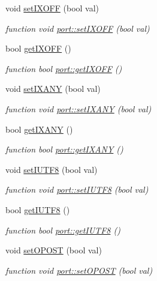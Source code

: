 \begin{DoxyCompactItemize}
void \hyperlink{classport_a0598bc43a59cb71fb08060249d7805da}{set\+I\+X\+O\+FF} (bool val)
\begin{DoxyCompactList}\small\item\em function void \hyperlink{classport_a0598bc43a59cb71fb08060249d7805da}{port\+::set\+I\+X\+O\+FF} (bool val) \end{DoxyCompactList}\item 
bool \hyperlink{classport_a3d517d3f06731348488002fea13b8e88}{get\+I\+X\+O\+FF} ()
\begin{DoxyCompactList}\small\item\em function bool \hyperlink{classport_a3d517d3f06731348488002fea13b8e88}{port\+::get\+I\+X\+O\+FF} () \end{DoxyCompactList}\item 
void \hyperlink{classport_afa286d567530f7b124b7fc2caac4d61a}{set\+I\+X\+A\+NY} (bool val)
\begin{DoxyCompactList}\small\item\em function void \hyperlink{classport_afa286d567530f7b124b7fc2caac4d61a}{port\+::set\+I\+X\+A\+NY} (bool val) \end{DoxyCompactList}\item 
bool \hyperlink{classport_a4a85ca57362115255b5e0049b90ff4e7}{get\+I\+X\+A\+NY} ()
\begin{DoxyCompactList}\small\item\em function bool \hyperlink{classport_a4a85ca57362115255b5e0049b90ff4e7}{port\+::get\+I\+X\+A\+NY} () \end{DoxyCompactList}\item 
void \hyperlink{classport_a7e2ce41de280c0167bcf414c2cbe5dcf}{set\+I\+U\+T\+F8} (bool val)
\begin{DoxyCompactList}\small\item\em function void \hyperlink{classport_a7e2ce41de280c0167bcf414c2cbe5dcf}{port\+::set\+I\+U\+T\+F8} (bool val) \end{DoxyCompactList}\item 
bool \hyperlink{classport_a9575ab3023169a91c984f458702c2f53}{get\+I\+U\+T\+F8} ()
\begin{DoxyCompactList}\small\item\em function bool \hyperlink{classport_a9575ab3023169a91c984f458702c2f53}{port\+::get\+I\+U\+T\+F8} () \end{DoxyCompactList}\item 
void \hyperlink{classport_a4c7b692b00a8a85b4155e672a8673117}{set\+O\+P\+O\+ST} (bool val)
\begin{DoxyCompactList}\small\item\em function void \hyperlink{classport_a4c7b692b00a8a85b4155e672a8673117}{port\+::set\+O\+P\+O\+ST} (bool val) \end{DoxyCompactList}\item 

\end{DoxyCompactItemize}
